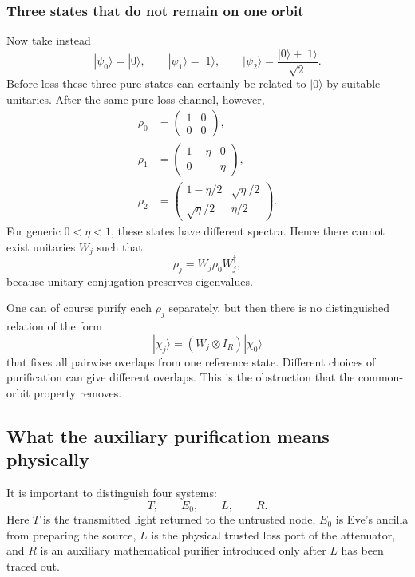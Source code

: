 \documentclass[11pt]{article}
\theoremstyle{remark}
\begin{document}
\subsubsection{Three states that do not remain on one orbit}

Now take instead
\[
    |\psi_0\rangle=|0\rangle,
    \qquad
    |\psi_1\rangle=|1\rangle,
    \qquad
    |\psi_2\rangle
    =
    \frac{|0\rangle+|1\rangle}{\sqrt2}.
\]
Before loss these three pure states can certainly be related to
\(|0\rangle\) by suitable unitaries.  After the same pure-loss channel,
however,
\begin{align}
    \rho_0
    &=
    \begin{pmatrix}
        1&0\\
        0&0
    \end{pmatrix},
    \\
    \rho_1
    &=
    \begin{pmatrix}
        1-\eta&0\\
        0&\eta
    \end{pmatrix},
    \\
    \rho_2
    &=
    \begin{pmatrix}
        1-\eta/2&\sqrt{\eta}/2\\
        \sqrt{\eta}/2&\eta/2
    \end{pmatrix}.
    \label{eq:app-nonorbit-rhos}
\end{align}
For generic \(0<\eta<1\), these states have different spectra.  Hence there
cannot exist unitaries \(W_j\) such that
\[
    \rho_j=W_j\rho_0W_j^\dagger,
\]
because unitary conjugation preserves eigenvalues.

One can of course purify each \(\rho_j\) separately, but then there is no
distinguished relation of the form
\[
    |\chi_j\rangle
    =
    (W_j\otimes I_R)|\chi_0\rangle
\]
that fixes all pairwise overlaps from one reference state.  Different choices
of purification can give different overlaps.  This is the obstruction that
the common-orbit property removes.

\subsection{What the auxiliary purification means physically}
\label{app:purifier-meaning}

It is important to distinguish four systems:
\[
    T,\qquad E_0,\qquad L,\qquad R.
\]
Here \(T\) is the transmitted light returned to the untrusted node,
\(E_0\) is Eve's ancilla from preparing the source, \(L\) is the physical
trusted loss port of the attenuator, and \(R\) is an auxiliary mathematical
purifier introduced only after \(L\) has been traced out.
\end{document}
